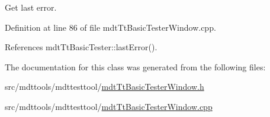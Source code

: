 Get last error. 



Definition at line 86 of file mdt\-Tt\-Basic\-Tester\-Window.\-cpp.



References mdt\-Tt\-Basic\-Tester\-::last\-Error().



The documentation for this class was generated from the following files\-:\begin{DoxyCompactItemize}
\item 
src/mdttools/mdttesttool/\hyperlink{mdt_tt_basic_tester_window_8h}{mdt\-Tt\-Basic\-Tester\-Window.\-h}\item 
src/mdttools/mdttesttool/\hyperlink{mdt_tt_basic_tester_window_8cpp}{mdt\-Tt\-Basic\-Tester\-Window.\-cpp}\end{DoxyCompactItemize}
